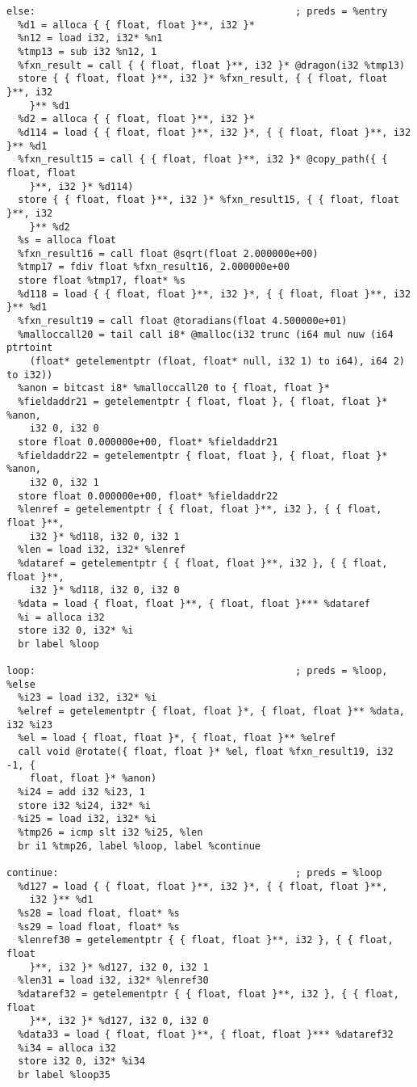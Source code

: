 \documentclass[main.tex]{subfiles}
\begin{document}
{\begin{lstlisting}
else:                                             ; preds = %entry
  %d1 = alloca { { float, float }**, i32 }*
  %n12 = load i32, i32* %n1
  %tmp13 = sub i32 %n12, 1
  %fxn_result = call { { float, float }**, i32 }* @dragon(i32 %tmp13)
  store { { float, float }**, i32 }* %fxn_result, { { float, float }**, i32 
    }** %d1
  %d2 = alloca { { float, float }**, i32 }*
  %d114 = load { { float, float }**, i32 }*, { { float, float }**, i32 }** %d1
  %fxn_result15 = call { { float, float }**, i32 }* @copy_path({ { float, float
    }**, i32 }* %d114)
  store { { float, float }**, i32 }* %fxn_result15, { { float, float }**, i32 
    }** %d2
  %s = alloca float
  %fxn_result16 = call float @sqrt(float 2.000000e+00)
  %tmp17 = fdiv float %fxn_result16, 2.000000e+00
  store float %tmp17, float* %s
  %d118 = load { { float, float }**, i32 }*, { { float, float }**, i32 }** %d1
  %fxn_result19 = call float @toradians(float 4.500000e+01)
  %malloccall20 = tail call i8* @malloc(i32 trunc (i64 mul nuw (i64 ptrtoint 
    (float* getelementptr (float, float* null, i32 1) to i64), i64 2) to i32))
  %anon = bitcast i8* %malloccall20 to { float, float }*
  %fieldaddr21 = getelementptr { float, float }, { float, float }* %anon, 
    i32 0, i32 0
  store float 0.000000e+00, float* %fieldaddr21
  %fieldaddr22 = getelementptr { float, float }, { float, float }* %anon, 
    i32 0, i32 1
  store float 0.000000e+00, float* %fieldaddr22
  %lenref = getelementptr { { float, float }**, i32 }, { { float, float }**,
    i32 }* %d118, i32 0, i32 1
  %len = load i32, i32* %lenref
  %dataref = getelementptr { { float, float }**, i32 }, { { float, float }**,
    i32 }* %d118, i32 0, i32 0
  %data = load { float, float }**, { float, float }*** %dataref
  %i = alloca i32
  store i32 0, i32* %i
  br label %loop

loop:                                             ; preds = %loop, %else
  %i23 = load i32, i32* %i
  %elref = getelementptr { float, float }*, { float, float }** %data, i32 %i23
  %el = load { float, float }*, { float, float }** %elref
  call void @rotate({ float, float }* %el, float %fxn_result19, i32 -1, { 
    float, float }* %anon)
  %i24 = add i32 %i23, 1
  store i32 %i24, i32* %i
  %i25 = load i32, i32* %i
  %tmp26 = icmp slt i32 %i25, %len
  br i1 %tmp26, label %loop, label %continue

continue:                                         ; preds = %loop
  %d127 = load { { float, float }**, i32 }*, { { float, float }**, 
    i32 }** %d1
  %s28 = load float, float* %s
  %s29 = load float, float* %s
  %lenref30 = getelementptr { { float, float }**, i32 }, { { float, float 
    }**, i32 }* %d127, i32 0, i32 1
  %len31 = load i32, i32* %lenref30
  %dataref32 = getelementptr { { float, float }**, i32 }, { { float, float 
    }**, i32 }* %d127, i32 0, i32 0
  %data33 = load { float, float }**, { float, float }*** %dataref32
  %i34 = alloca i32
  store i32 0, i32* %i34
  br label %loop35


\end{lstlisting}}
\end{document}
